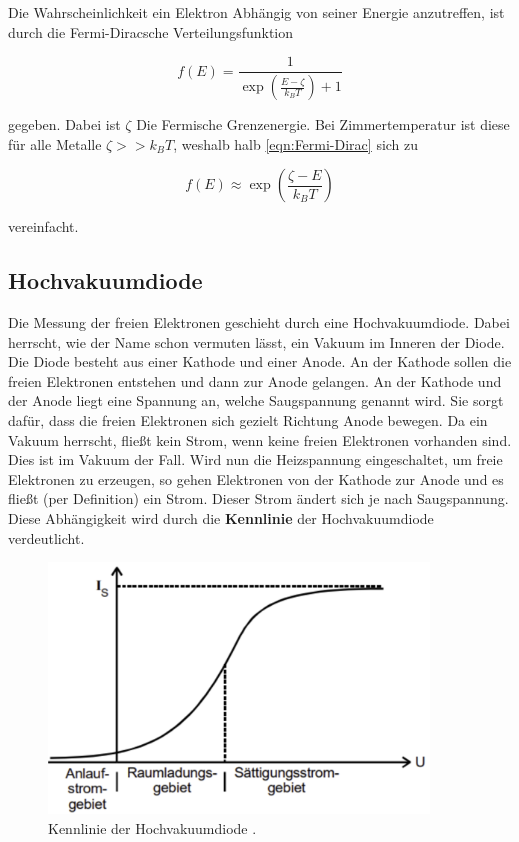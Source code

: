 \noindent Die Wahrscheinlichkeit ein Elektron Abhängig von seiner Energie anzutreffen, ist durch die Fermi-Diracsche 
Verteilungsfunktion 

\begin{equation}
    f(E)=\frac{1}{\exp{\left(\frac{E-\zeta}{k_B T}\right)} + 1}
    \label{eqn:Fermi-Dirac}
\end{equation}

\noindent gegeben. Dabei ist $\zeta$ Die Fermische Grenzenergie. Bei Zimmertemperatur ist diese für alle Metalle 
$\zeta >>k_B T$, weshalb halb \autoref{eqn:Fermi-Dirac} sich zu 

\begin{equation*}
    f(E) \approx \exp{\left(\frac{\zeta - E}{k_B T}\right)}
\end{equation*}

\noindent vereinfacht.


\subsection{Hochvakuumdiode}
Die Messung der freien Elektronen geschieht durch eine Hochvakuumdiode. Dabei herrscht, wie der Name schon vermuten 
lässt, ein Vakuum im Inneren der Diode. Die Diode besteht aus einer Kathode und einer Anode. An der Kathode sollen 
die freien Elektronen entstehen und dann zur Anode gelangen. An der Kathode und der Anode liegt eine Spannung an, 
welche Saugspannung genannt wird. Sie sorgt dafür, dass die freien Elektronen sich gezielt Richtung Anode bewegen. 
Da ein Vakuum herrscht, fließt kein Strom, wenn keine freien Elektronen vorhanden sind. Dies ist im Vakuum der Fall. 
Wird nun die Heizspannung eingeschaltet, um freie Elektronen zu erzeugen, so gehen Elektronen von der Kathode zur 
Anode und es fließt (per Definition) ein Strom. Dieser Strom ändert sich je nach Saugspannung. Diese Abhängigkeit 
wird durch die \textbf{Kennlinie} der Hochvakuumdiode verdeutlicht. 

\begin{figure}
    \centering
    \includegraphics[width=0.9\textwidth]{content/Kennlinie.png}
    \caption{Kennlinie der Hochvakuumdiode \cite{Versuchsanleitung_v504}.}
\end{figure}


